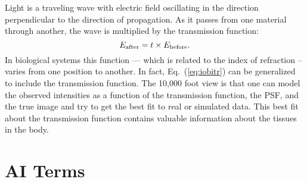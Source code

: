 \documentclass[prd,amsmath,aps,floats,amssymb, floatfix,
  superscriptaddress,nofootinbib]{revtex4-1}
\newcommand{\ec}[1]{Eq.~(\ref{eq:#1})}
\numberwithin{equation}{section}
\newcommand\be{\begin{equation}}
\newcommand\ee{\end{equation}}
\begin{document}
Light is a traveling wave with electric field oscillating in the direction perpendicular to the direction of propagation. As it passes from one material through another, the wave is multiplied by the transmission function:
\be
E_{\rm after} = t\times E_{\rm before}
.\ee
In biological systems this function --- which is related to the index of refraction -- varies from one position to another. In fact, \ec{iobitr} can be generalized to include the transmission function. The 10,000 foot view is that one can model the observed intensities as a function of the transmission function, the PSF, and the true image and try to get the best fit to real or simulated data. This best fit about the transmission function contains valuable information about the tissues in the body.


 
 \appendix
 
  
 \section{AI Terms}\label{sec:unblind}
 
\end{document}
